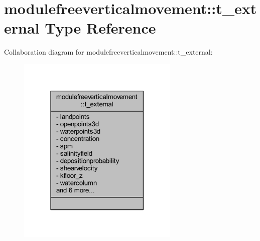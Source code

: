 \hypertarget{structmodulefreeverticalmovement_1_1t__external}{}\section{modulefreeverticalmovement\+:\+:t\+\_\+external Type Reference}
\label{structmodulefreeverticalmovement_1_1t__external}


Collaboration diagram for modulefreeverticalmovement\+:\+:t\+\_\+external\+:\nopagebreak
\begin{figure}[H]
\begin{center}
\leavevmode
\includegraphics[width=218pt]{structmodulefreeverticalmovement_1_1t__external__coll__graph}
\end{center}
\end{figure}
